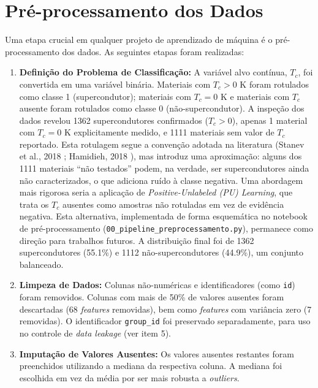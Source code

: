 \documentclass[12pt, a4paper, oneside]{report}
\begin{document}
\section{Pré-processamento dos Dados}

Uma etapa crucial em qualquer projeto de aprendizado de máquina é o pré-processamento dos dados. As seguintes etapas foram realizadas:

\begin{enumerate}
    \item \textbf{Definição do Problema de Classificação:} A variável alvo contínua, $T_c$, foi convertida em uma variável binária. Materiais com $T_c > 0$ K foram rotulados como classe 1 (supercondutor); materiais com $T_c = 0$ K e materiais com $T_c$ ausente foram rotulados como classe 0 (não-supercondutor). A inspeção dos dados revelou 1362 supercondutores confirmados ($T_c > 0$), apenas 1 material com $T_c = 0$ K explicitamente medido, e 1111 materiais sem valor de $T_c$ reportado. Esta rotulagem segue a convenção adotada na literatura (Stanev et al., 2018 \cite{stanev2018}; Hamidieh, 2018 \cite{hamidieh2018}), mas introduz uma aproximação: alguns dos 1111 materiais ``não testados'' podem, na verdade, ser supercondutores ainda não caracterizados, o que adiciona ruído à classe negativa. Uma abordagem mais rigorosa seria a aplicação de \textit{Positive-Unlabeled (PU) Learning}, que trata os $T_c$ ausentes como amostras não rotuladas em vez de evidência negativa. Esta alternativa, implementada de forma esquemática no notebook de pré-processamento (\texttt{00\_pipeline\_preprocessamento.py}), permanece como direção para trabalhos futuros. A distribuição final foi de 1362 supercondutores (55.1\%) e 1112 não-supercondutores (44.9\%), um conjunto balanceado.
    
    \item \textbf{Limpeza de Dados:} Colunas não-numéricas e identificadores (como \texttt{id}) foram removidos. Colunas com mais de 50\% de valores ausentes foram descartadas (68 \textit{features} removidas), bem como \textit{features} com variância zero (7 removidas). O identificador \texttt{group\_id} foi preservado separadamente, para uso no controle de \textit{data leakage} (ver item 5).
    
    \item \textbf{Imputação de Valores Ausentes:} Os valores ausentes restantes foram preenchidos utilizando a mediana da respectiva coluna. A mediana foi escolhida em vez da média por ser mais robusta a \textit{outliers}.
    

\end{enumerate}
\end{document}
